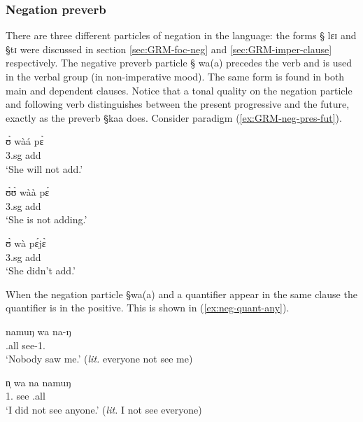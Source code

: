 \subsubsection{Negation preverb}
\label{sec:GRM-verb-neg}



There are three different particles of negation in the language:  the forms {\S
lɛɪ} and {\S tɪ}   were discussed in section   \ref{sec:GRM-foc-neg} and
\ref{sec:GRM-imper-clause} respectively.  The negative preverb particle {\S
wa(a)} precedes the verb and is used in the verbal group (in non-imperative
mood). The same form is found in both  main and dependent clauses. Notice that a
tonal quality on the negation particle and following verb  distinguishes
between the present
progressive and  the future,  exactly as the preverb {\S kaa} does.  Consider 
paradigm (\ref{ex:GRM-neg-pres-fut}). 

\begin{exe}
\ex\label{ex:GRM-neg-pres-fut}
\begin{xlist}
\ex
\gll ʊ̀  wàá pɛ̀ \\
   {\sc 3.sg}  {\neg} add\\
\glt  `She will not add.'

 \ex 
\gll  ʊ̀ʊ̀ wàà pɛ́\\
     {\sc 3.sg} {\neg} add \\
\glt  `She is not adding.'


 \ex 
\gll  ʊ̀ wà pɛ́jɛ̀\\
     {\sc 3.sg} {\neg} add \\
\glt  `She didn't  add.'
\end{xlist}
\end{exe}


When the negation particle {\S wa(a)} and a quantifier appear in the same clause
the quantifier is  in the positive. This is shown in (\ref{ex:neg-quant-any}).

\begin{exe}
\ex\label{ex:neg-quant-any}
 \begin{xlist}
  
\ex\label{ex:vp2.6}
\gll namuŋ wa na-ŋ \\
 {\clf}.all {\neg} see-{1.\sg}\\
\glt  `Nobody saw me.' ({\it lit.} everyone not see me) 

\ex\label{ex:vp2.5}
\gll  n̩ wa na namuŋ  \\
  {1.\sg}  {\neg}   see  {\clf}.all\\
\glt  `I did not see anyone.' ({\it lit.} I not see everyone) 
\end{xlist}
\end{exe}



